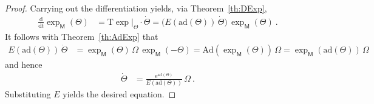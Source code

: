 \documentclass[10pt,a4paper]{article}
\theoremstyle{mytheorem}
\theoremstyle{mydefinition}
\newcommand{\dt}{\mathrm{d}}
\newcommand{\Tt}{\mathrm{T}}
\newcommand{\ad}{\mathrm{ad}}
\newcommand{\Ad}{\mathrm{Ad}}
\begin{document}
\begin{proof}
Carrying out the differentiation yields, via Theorem~\ref{th:DExp},
\begin{align*}
	\frac{\dt}{\dt t}\exp_\mathsf{M}(\Theta)
	&= \Tt \exp|_\Theta\cdot\dot{\Theta}
	= \big(
		E(\ad(\Theta))\,\dot{\Theta}
	\big)\,\exp_\mathsf{M}(\Theta)
	\ .
\end{align*}
It follows with Theorem~\ref{th:AdExp} that
\begin{align*}
	E(\ad(\Theta))\,\dot{\Theta}
	&=
	\exp_\mathsf{M}(\Theta)\,\Omega\,\exp_\mathsf{M}(-\Theta)
	= \Ad(\exp_\mathsf{M}(\Theta))\,\Omega
	= \exp_\mathsf{M}(\ad(\Theta))\,\Omega
\end{align*}
and hence
\begin{align*}
	\dot{\Theta}
	&=
	\frac{\mathrm{e}^{\ad(\Theta)}}{E(\ad(\Theta))}
	\,\Omega
	\ .
\end{align*}
Substituting $E$ yields the desired equation.
\end{proof}
\end{document}
